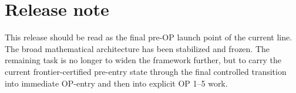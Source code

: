 \section*{Release note}
This release should be read as the final pre-OP launch point of the current line. The broad mathematical architecture has been stabilized and frozen. The remaining task is no longer to widen the framework further, but to carry the current frontier-certified pre-entry state through the final controlled transition into immediate OP-entry and then into explicit OP 1--5 work.

\appendix
\setcounter{section}{0}
\renewcommand{\thesection}{H\arabic{section}}
\renewcommand{\thesubsection}{H\arabic{section}.\arabic{subsection}}


